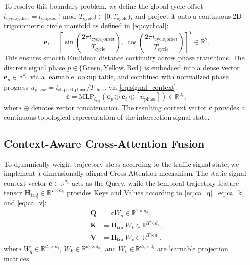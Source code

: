 \documentclass[journal]{IEEEtran}
\begin{document}
To resolve this boundary problem, we define the global cycle offset $t_{\text{cycle\_offset}} = t_{\text{elapsed}} \pmod{T_{\text{cycle}}} \in [0, T_{\text{cycle}})$, and project it onto a continuous 2D trigonometric circle manifold as defined in \eqref{eq:cyclical}:
\begin{equation}
\mathbf{e}_t = \left[ \sin\left(\frac{2\pi t_{\text{cycle\_offset}}}{T_{\text{cycle}}}\right), \, \cos\left(\frac{2\pi t_{\text{cycle\_offset}}}{T_{\text{cycle}}}\right) \right]^T \in \mathbb{R}^2.
\label{eq:cyclical}
\end{equation}
This ensures smooth Euclidean distance continuity across phase transitions. The discrete signal phase $p \in \{\text{Green}, \text{Yellow}, \text{Red}\}$ is embedded into a dense vector $\mathbf{e}_p \in \mathbb{R}^{d_p}$ via a learnable lookup table, and combined with normalized phase progress $u_{\text{phase}} = t_{\text{elapsed,phase}} / T_{\text{phase}}$ via \eqref{eq:signal_context}:
\begin{equation}
\mathbf{c} = \text{MLP}_{\theta_{\text{sig}}}\left( \mathbf{e}_p \oplus \mathbf{e}_t \oplus [u_{\text{phase}}] \right) \in \mathbb{R}^{d_c},
\label{eq:signal_context}
\end{equation}
where $\oplus$ denotes vector concatenation. The resulting context vector $\mathbf{c}$ provides a continuous topological representation of the intersection signal state.

\subsection{Context-Aware Cross-Attention Fusion}\label{sec:crossattn}
To dynamically weight trajectory steps according to the traffic signal state, we implement a dimensionally aligned Cross-Attention mechanism. The static signal context vector $\mathbf{c} \in \mathbb{R}^{d_c}$ acts as the Query, while the temporal trajectory feature tensor $\mathbf{H}_{\text{traj}} \in \mathbb{R}^{T \times d_h}$ provides Keys and Values according to \eqref{eq:ca_q}, \eqref{eq:ca_k}, and \eqref{eq:ca_v}:
\begin{align}
\mathbf{Q} &= \mathbf{c} W_q \in \mathbb{R}^{1 \times d_a}, \label{eq:ca_q} \\
\mathbf{K} &= \mathbf{H}_{\text{traj}} W_k \in \mathbb{R}^{T \times d_a}, \label{eq:ca_k} \\
\mathbf{V} &= \mathbf{H}_{\text{traj}} W_v \in \mathbb{R}^{T \times d_v}, \label{eq:ca_v}
\end{align}
where $W_q \in \mathbb{R}^{d_c \times d_a}$, $W_k \in \mathbb{R}^{d_h \times d_a}$, and $W_v \in \mathbb{R}^{d_h \times d_v}$ are learnable projection matrices.
\end{document}
